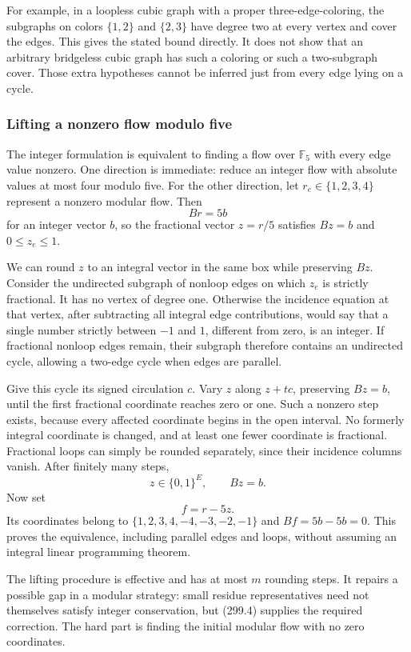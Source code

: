 \documentclass[11pt]{article}
\begin{document}
For example, in a loopless cubic graph with a proper three-edge-coloring, the subgraphs on colors $\{1,2\}$ and $\{2,3\}$ have degree two at every vertex and cover the edges. This gives the stated bound directly. It does not show that an arbitrary bridgeless cubic graph has such a coloring or such a two-subgraph cover. Those extra hypotheses cannot be inferred just from every edge lying on a cycle.

\subsubsection{Lifting a nonzero flow modulo five}
The integer formulation is equivalent to finding a flow over $\mathbb F_5$ with every edge value nonzero. One direction is immediate: reduce an integer flow with absolute values at most four modulo five. For the other direction, let $r_e\in\{1,2,3,4\}$ represent a nonzero modular flow. Then
\[
 Br=5b
\]
for an integer vector $b$, so the fractional vector $z=r/5$ satisfies
$Bz=b$ and $0\le z_e\le1$.

We can round $z$ to an integral vector in the same box while preserving $Bz$. Consider the undirected subgraph of nonloop edges on which $z_e$ is strictly fractional. It has no vertex of degree one. Otherwise the incidence equation at that vertex, after subtracting all integral edge contributions, would say that a single number strictly between $-1$ and $1$, different from zero, is an integer. If fractional nonloop edges remain, their subgraph therefore contains an undirected cycle, allowing a two-edge cycle when edges are parallel.

Give this cycle its signed circulation $c$. Vary $z$ along $z+tc$, preserving $Bz=b$, until the first fractional coordinate reaches zero or one. Such a nonzero step exists, because every affected coordinate begins in the open interval. No formerly integral coordinate is changed, and at least one fewer coordinate is fractional. Fractional loops can simply be rounded separately, since their incidence columns vanish. After finitely many steps,
\[
 z\in\{0,1\}^E,\qquad Bz=b.
\]
Now set
\[
 f=r-5z.
 \tag{299.4}
\]
Its coordinates belong to $\{1,2,3,4,-4,-3,-2,-1\}$ and
$Bf=5b-5b=0$. This proves the equivalence, including parallel edges and loops, without assuming an integral linear programming theorem.

The lifting procedure is effective and has at most $m$ rounding steps. It repairs a possible gap in a modular strategy: small residue representatives need not themselves satisfy integer conservation, but (299.4) supplies the required correction. The hard part is finding the initial modular flow with no zero coordinates.
\end{document}
